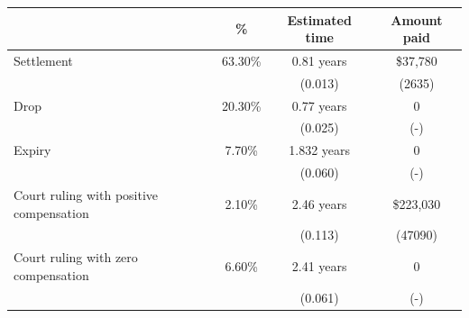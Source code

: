 \begin{tabular}{rccc}
\toprule
      & \%    & Estimated time & Amount paid \\
\midrule
\midrule
\multicolumn{1}{l}{Settlement} & 63.30\% & 0.81 years & \$37,780  \\
      &       & (0.013) & (2635) \\
\multicolumn{1}{l}{Drop} & 20.30\% & 0.77 years  & 0 \\
      &       & (0.025) & (-) \\
\multicolumn{1}{l}{Expiry} & 7.70\% & 1.832 years & 0 \\
      &       & (0.060) & (-) \\
\multicolumn{1}{l}{Court ruling with positive compensation} & 2.10\% & 2.46 years & \$223,030  \\
      &       & (0.113) & (47090) \\
\multicolumn{1}{l}{Court ruling with zero compensation} & 6.60\% & 2.41 years & 0 \\
      &       & (0.061) & (-) \\
\bottomrule
\bottomrule
\end{tabular}%
